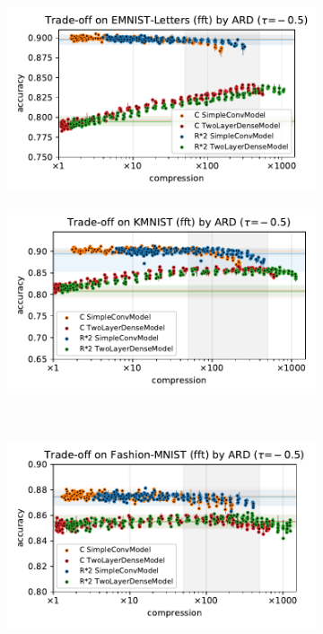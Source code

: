 \documentclass[a4paper,10pt,onecolumn]{article}
\begin{document}
\begin{figure}[b]
  \centering
  \begin{subfigure}[b]{0.5\columnwidth}
    \centering
    \includegraphics[width=\linewidth]{figure__mnist-like__trade-off/appendix__cmp__ARD__emnist_letters__fft__-0.5.pdf}
  \end{subfigure}%
  \begin{subfigure}[b]{0.5\columnwidth}
    \centering
    \includegraphics[width=\linewidth]{figure__mnist-like__trade-off/appendix__cmp__ARD__kmnist__fft__-0.5.pdf}
  \end{subfigure} \\ %
  \begin{subfigure}[b]{0.5\columnwidth}
    \centering
    \includegraphics[width=\linewidth]{figure__mnist-like__trade-off/appendix__cmp__ARD__fashionmnist__fft__-0.5.pdf}

\end{subfigure}
\end{figure}
\end{document}
